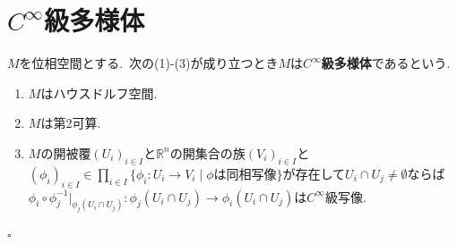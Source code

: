 \section{$C^{\infty}$級多様体}
\begin{definition}
$M$を位相空間とする.\ 次の(1)-(3)が成り立つとき$M$は\textbf{$C^{\infty}$級多様体}であるという.
\def\labelenumi{(\theenumi)}
\begin{enumerate}
  \item $M$はハウスドルフ空間.
  \item $M$は第2可算.
  \item $M$の開被覆$(U_i)_{i \in I}$と$\mathbb{R}^n$の開集合の族$(V_i)_{i \in I}$と$(\phi_i)_{i \in I} \in \prod_{i \in I} \{\phi_i \colon U_i \to V_i \mid \phi\text{は同相写像} \}$が存在して$U_i \cap U_j \neq \emptyset$ならば$\phi_i \circ \phi_j^{-1} \vert_{\phi_j(U_i \cap U_j)} \colon \phi_j(U_i \cap U_j) \to \phi_i(U_i \cap U_j)$は$C^{\infty}$級写像.
\end{enumerate}
\hfill $\square$
\end{definition}